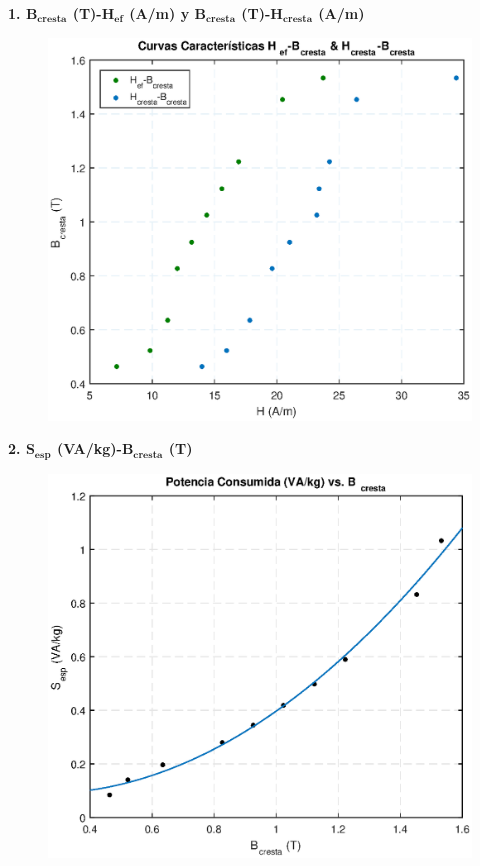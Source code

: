 \documentclass[a4paper,titlepage]{article}
\begin{document}
{{\textbf{1. $\mathbf{B_{cresta}}$ (T)-$\mathbf{H_{ef}}$ (A/m) y $\mathbf{B_{cresta}}$ (T)-$\mathbf{H_{cresta}}$ (A/m)}\\
\begin{figure}[ht]
 \centering
     \includegraphics[width=\textwidth]{byh.eps}
\end{figure}
\newpage
\textbf{2. $\mathbf{S_{esp}}$ (VA/kg)-$\mathbf{B_{cresta}}$ (T)}\\
\begin{figure}[ht]
 \centering
     \includegraphics[width=\textwidth]{potencia.eps}
\end{figure}

}}
\end{document}
